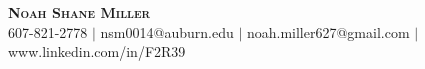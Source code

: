 \begin{center}
    \textbf{\Huge \scshape Noah Shane Miller} \\ \vspace{1pt}
    \small 607-821-2778 $|$ nsm0014@auburn.edu $|$ noah.miller627@gmail.com $|$
    www.linkedin.com/in/F2R39
\end{center}